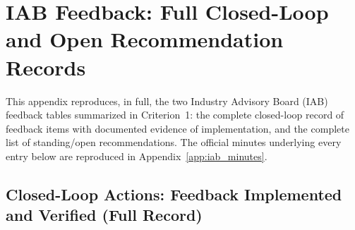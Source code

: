 \chapter{IAB Feedback: Full Closed-Loop and Open Recommendation Records}\label{app:iab_feedback_full}

This appendix reproduces, in full, the two Industry Advisory Board (IAB) feedback tables summarized in Criterion~1: the complete closed-loop record of feedback items with documented evidence of implementation, and the complete list of standing/open recommendations. The official minutes underlying every entry below are reproduced in Appendix~\ref{app:iab_minutes}.

\section{Closed-Loop Actions: Feedback Implemented and Verified (Full Record)}

